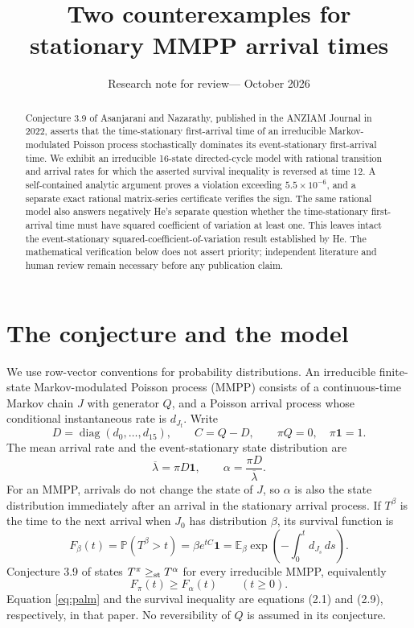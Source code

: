 \documentclass[11pt]{article}
\title{Two counterexamples for\\stationary MMPP arrival times}
\author{}
\date{Research note for review\quad---\quad 2 October 2026}
\newcommand{\one}{\mathbf 1}
\newcommand{\EE}{\mathbb E}
\newcommand{\PP}{\mathbb P}
\newcommand{\diag}{\operatorname{diag}}
\begin{document}
\maketitle
\begin{abstract}
Conjecture 3.9 of Asanjarani and Nazarathy, published in the ANZIAM
Journal in 2022, asserts that the time-stationary first-arrival time of
an irreducible Markov-modulated Poisson process stochastically dominates
its event-stationary first-arrival time. We exhibit an irreducible
16-state directed-cycle model with rational transition and arrival
rates for which the asserted survival inequality is reversed at time
$12$. A self-contained analytic argument proves a violation exceeding
$5.5\times10^{-6}$, and a separate exact rational matrix-series
certificate verifies the sign. The same rational model also answers negatively He's separate question
whether the time-stationary first-arrival time must have squared
coefficient of variation at least one. This leaves intact the
event-stationary squared-coefficient-of-variation result established
by He. The mathematical verification below does not assert priority;
independent literature and human review remain necessary before any
publication claim.
\end{abstract}

\section{The conjecture and the model}
We use row-vector conventions for probability distributions. An
irreducible finite-state Markov-modulated Poisson process (MMPP) consists
of a continuous-time Markov chain $J$ with generator $Q$, and a Poisson
arrival process whose conditional instantaneous rate is $d_{J_t}$.
Write
\[
 D=\diag(d_0,\ldots,d_{15}),\qquad C=Q-D,
 \qquad \pi Q=0,\quad \pi\one=1.
\]
The mean arrival rate and the event-stationary state distribution are
\begin{equation}\label{eq:palm}
 \overline\lambda=\pi D\one,\qquad
 \alpha=\frac{\pi D}{\overline\lambda}.
\end{equation}
For an MMPP, arrivals do not change the state of $J$, so $\alpha$ is
also the state distribution immediately after an arrival in the
stationary arrival process. If $T^\beta$ is the time to the next arrival
when $J_0$ has distribution $\beta$, its survival function is
\begin{equation}\label{eq:survival}
 F_\beta(t)=\PP(T^\beta>t)=\beta e^{tC}\one
 =\EE_\beta\exp\left(-\int_0^t d_{J_s}\,ds\right).
\end{equation}
Conjecture 3.9 of \cite{AN} states $T^\pi\geq_{\rm st}T^\alpha$ for every
irreducible MMPP, equivalently
\begin{equation}\label{eq:conjecture}
 F_\pi(t)\geq F_\alpha(t)\qquad(t\geq0).
\end{equation}
Equation \eqref{eq:palm} and the survival inequality are equations
(2.1) and (2.9), respectively, in that paper. No reversibility of $Q$
is assumed in its conjecture.
\end{document}
